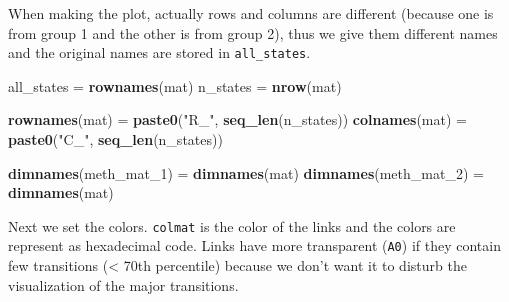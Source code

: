 \documentclass[]{book}
\newenvironment{Shaded}{\begin{snugshade}}{\end{snugshade}}
\newcommand{\KeywordTok}[1]{\textcolor[rgb]{0.13,0.29,0.53}{\textbf{#1}}}
\newcommand{\DecValTok}[1]{\textcolor[rgb]{0.00,0.00,0.81}{#1}}
\newcommand{\StringTok}[1]{\textcolor[rgb]{0.31,0.60,0.02}{#1}}
\newcommand{\NormalTok}[1]{#1}
\begin{document}
When making the plot, actually rows and columns are different (because
one is from group 1 and the other is from group 2), thus we give them
different names and the original names are stored in
\texttt{all\_states}.

\begin{Shaded}
\begin{Highlighting}[]
\NormalTok{all_states =}\StringTok{ }\KeywordTok{rownames}\NormalTok{(mat)}
\NormalTok{n_states =}\StringTok{ }\KeywordTok{nrow}\NormalTok{(mat)}

\KeywordTok{rownames}\NormalTok{(mat) =}\StringTok{ }\KeywordTok{paste0}\NormalTok{(}\StringTok{"R_"}\NormalTok{, }\KeywordTok{seq_len}\NormalTok{(n_states))}
\KeywordTok{colnames}\NormalTok{(mat) =}\StringTok{ }\KeywordTok{paste0}\NormalTok{(}\StringTok{"C_"}\NormalTok{, }\KeywordTok{seq_len}\NormalTok{(n_states))}

\KeywordTok{dimnames}\NormalTok{(meth_mat_}\DecValTok{1}\NormalTok{) =}\StringTok{ }\KeywordTok{dimnames}\NormalTok{(mat)}
\KeywordTok{dimnames}\NormalTok{(meth_mat_}\DecValTok{2}\NormalTok{) =}\StringTok{ }\KeywordTok{dimnames}\NormalTok{(mat)}
\end{Highlighting}
\end{Shaded}

Next we set the colors. \texttt{colmat} is the color of the links and
the colors are represent as hexadecimal code. Links have more
transparent (\texttt{A0}) if they contain few transitions (\textless{}
70th percentile) because we don't want it to disturb the visualization
of the major transitions.
\end{document}
